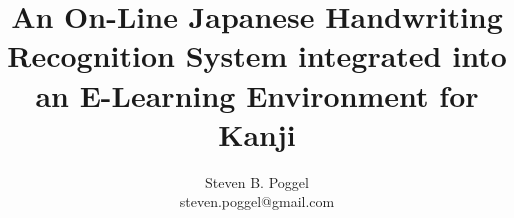 
\title{An On-Line Japanese Handwriting Recognition System integrated into an E-Learning Environment for Kanji}
\author{Steven B. Poggel\\
steven.poggel@gmail.com}


%



